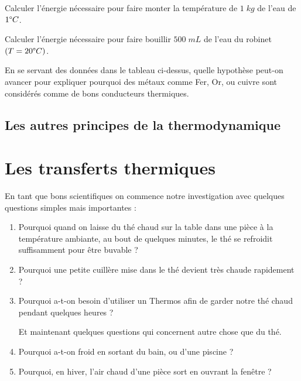 \documentclass[11pt,a4paper]{article}
\begin{document}
\begin{exo}
Calculer l’énergie nécessaire pour faire monter la température de $1\;kg$ de l’eau de $1\degree C$.
\vspace{3cm}
\end{exo}

\begin{exo}
Calculer l’énergie nécessaire pour faire bouillir $500\; mL$ de l’eau du robinet $(T=20\degree C)$.  
\vspace{4cm}
\end{exo}

\begin{exo}
En se servant des données dans le tableau ci-dessus, quelle hypothèse peut-on avancer pour expliquer pourquoi des métaux comme Fer, Or, ou cuivre sont considérés comme de bons conducteurs thermiques. 
\vspace{4cm}
\end{exo}

\subsection{Les autres principes de la thermodynamique}

\section{Les transferts thermiques}

En tant que bons scientifiques on commence notre investigation avec quelques  questions simples mais importantes :
\begin{enumerate}
    \item Pourquoi quand on laisse du thé chaud sur la table dans une pièce à la température ambiante, au bout de quelques minutes, le thé se refroidit suffisamment pour être buvable ?
    \item Pourquoi une petite cuillère mise dans le thé devient très chaude rapidement ?
    \item Pourquoi a-t-on besoin d’utiliser un Thermos afin de garder notre thé chaud pendant quelques heures ?
    
    Et maintenant quelques questions qui concernent autre chose que du thé.
    \item Pourquoi a-t-on froid en sortant du bain, ou d’une piscine ?
    \item Pourquoi, en hiver,  l’air chaud d’une pièce sort en ouvrant la fenêtre ?
\end{enumerate}
\end{document}

